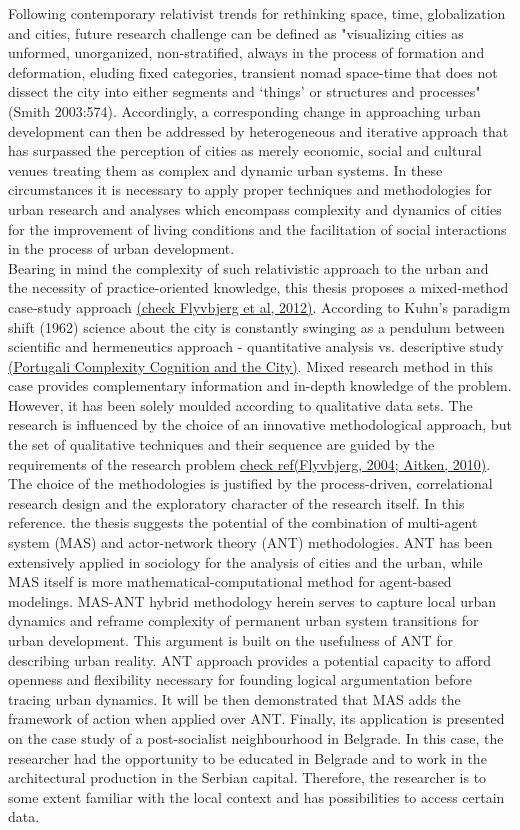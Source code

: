 \documentclass[11pt]{report}
\begin{document}
Following contemporary relativist trends for rethinking space, time, globalization and cities, future research challenge can be defined as "visualizing cities as unformed, unorganized, non-stratified, always in the process of formation and deformation, eluding fixed categories, transient nomad space-time that does not dissect the city into either segments and ‘things’ or structures and processes" (Smith 2003:574). Accordingly, a corresponding change in approaching urban development can then be addressed by heterogeneous and iterative approach that has surpassed the perception of cities as merely economic, social and cultural venues treating them as complex and dynamic urban systems. In these circumstances it is necessary to apply proper techniques and methodologies for urban research and analyses which encompass complexity and dynamics of cities for the improvement of living conditions and the facilitation of social interactions in the process of urban development. 
\\
Bearing in mind the complexity of such relativistic approach to the urban and the necessity of practice-oriented knowledge, this thesis proposes a mixed-method case-study approach \href{ref}{(check Flyvbjerg et al, 2012)}. According to Kuhn's paradigm shift (1962) science about the city is constantly swinging as a pendulum between scientific and hermeneutics approach - quantitative analysis vs. descriptive study \href{ref}{(Portugali Complexity Cognition and the City)}. Mixed research method in this case provides complementary information and in-depth knowledge of the problem. However, it has been solely moulded according to qualitative data sets. The research is influenced by the choice of an innovative methodological approach,  but  the  set of qualitative techniques  and  their  sequence  are  guided by the requirements of the research problem \href{ref}{check ref(Flyvbjerg, 2004; Aitken, 2010)}.
\\
The choice of the methodologies is justified by the process-driven, correlational research design and the exploratory character of the research itself. In this reference. the thesis suggests the potential of the combination of multi-agent system (MAS) and actor-network theory (ANT) methodologies. ANT has been extensively applied in sociology for the analysis of cities and the urban, while MAS itself is more mathematical-computational method for agent-based modelings. MAS-ANT hybrid methodology  herein serves to capture local urban dynamics and reframe complexity of permanent urban system transitions for urban development. This argument is built on the usefulness of ANT for describing urban reality. ANT approach provides a potential capacity to afford openness and flexibility necessary for founding logical argumentation before tracing urban dynamics. It will be then demonstrated that MAS adds the framework of action when applied over ANT. Finally, its application is presented on the case study of a post-socialist neighbourhood in Belgrade. In this case, the researcher had the opportunity to be educated in Belgrade and to work in the architectural production in the Serbian capital. Therefore, the  researcher is  to  some  extent  familiar  with  the  local  context  and has possibilities to access certain data.
\end{document}
